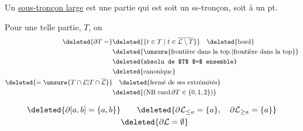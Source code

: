 Un \uline{sous-tronçon  large} est une  partie qui est soit un ss-tronçon, soit  à un pt.

Pour une telle partie, $T$, on
\[
\begin{aligned}
\deleted{\partial T=}&\deleted{\{t\in T\mid t\in \overline{\mathcal L\setminus T}\}}\quad\text{\deleted{bord}}\\
 &\text{\deleted{\unsure{frontière dans la top.|frontière dans la top}}}\\
 &\text{\deleted{absolu de $T$ $=$ ensemble}}\\
 &\text{\deleted{canonique}}\\
 \deleted{={}\unsure{T\cap\mathcal L|T\cap\overline{\mathcal L}}}&\quad\text{\deleted{fermé de ses extrémités}}\\
 &\deleted{(\mathrm{NB}\ \mathrm{card}\,\partial T\in\{0,1,2\})}
\end{aligned}
\]


\[
\begin{aligned}
 \deleted{\partial[a,b]=\{a,b\}}&\qquad \deleted{\partial \mathcal L_{\leq a}=\{a\},\quad \partial \mathcal L_{\geq a}=\{a\}}\\
 &\deleted{\partial\mathcal L=\emptyset}
\end{aligned}
\]


